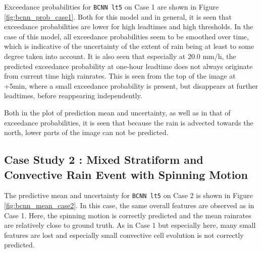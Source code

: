 Exceedance probabilities for \texttt{BCNN lt5} on Case 1 are shown in Figure \ref{fig:bcnn_prob_case1}. Both for this model and in general, it is seen that exceedance probabilities are lower for high leadtimes and high thresholds. In the case of this model, all exceedance probabilities seem to be smoothed over time, which is indicative of the uncertainty of the extent of rain being at least to some degree taken into account. It is also seen that especially at 20.0 mm/h, the predicted exceedance probability at one-hour leadtime does not always originate from current time high rainrates. This is seen from the top of the image at +5min, where a small exceedance probability is present, but disappears at further leadtimes, before reappearing independently. 



Both in the plot of prediction mean and uncertainty, as well as in that of exceedance probabilities, it is seen that because the rain is advected towards the north, lower parts of the image can not be predicted. 

\subsection{Case Study 2 : Mixed Stratiform and Convective Rain Event with Spinning Motion}

The predictive mean and uncertainty for \texttt{BCNN lt5} on Case 2 is shown in Figure \ref{fig:bcnn_mean_case2}. In this case, the same overall features are observed as in Case 1. Here, the spinning motion is correctly predicted and the mean rainrates are relatively close to ground truth. As in Case 1 but especially here, many small features are lost and especially small convective cell evolution is not correctly predicted. 

